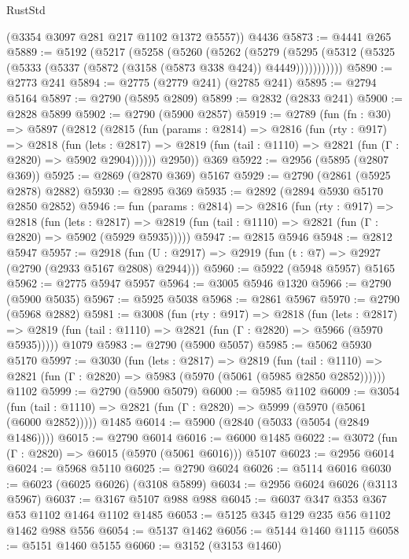 \begin{lexlean}{RustStd}
\begin{coremodule}
      (@3354 @3097 @281 @217 @1102 @1372 @5557))
    @4436
@5873 := @4441 @265
@5889 := @5192
    (@5217
      (@5258
        (@5260
          (@5262
            (@5279
              (@5295 (@5312 (@5325 (@5333 (@5337 (@5872 (@3158 (@5873 @338 @424)) @4449)))))))))))
@5890 := @2773 @241
@5894 := @2775 (@2779 @241) (@2785 @241)
@5895 := @2794 @5164
@5897 := @2790 (@5895 @2809)
@5899 := @2832 (@2833 @241)
@5900 := @2828 @5899
@5902 := @2790 (@5900 @2857)
@5919 := @2789
    (fun (fn : @30) =>
    @5897
      (@2812
        (@2815
          (fun (params : @2814) =>
          @2816
            (fun (rty : @917) =>
            @2818
              (fun (lets : @2817) =>
              @2819 (fun (tail : @1110) => @2821 (fun (Γ : @2820) => @5902 @2904))))))
        @2950))
    @369
@5922 := @2956 (@5895 (@2807 @369))
@5925 := @2869 (@2870 @369) @5167
@5929 := @2790 (@2861 (@5925 @2878) @2882)
@5930 := @2895 @369
@5935 := @2892 (@2894 @5930 @5170 @2850 @2852)
@5946 := fun (params : @2814) =>
  @2816
    (fun (rty : @917) =>
    @2818
      (fun (lets : @2817) =>
      @2819 (fun (tail : @1110) => @2821 (fun (Γ : @2820) => @5902 (@5929 @5935)))))
@5947 := @2815 @5946
@5948 := @2812 @5947
@5957 := @2918 (fun (U : @2917) => @2919 (fun (t : @7) => @2927 (@2790 (@2933 @5167 @2808) @2944)))
@5960 := @5922 (@5948 @5957) @5165
@5962 := @2775 @5947 @5957
@5964 := @3005 @5946 @1320
@5966 := @2790 (@5900 @5035)
@5967 := @5925 @5038
@5968 := @2861 @5967
@5970 := @2790 (@5968 @2882)
@5981 := @3008
    (fun (rty : @917) =>
    @2818
      (fun (lets : @2817) =>
      @2819 (fun (tail : @1110) => @2821 (fun (Γ : @2820) => @5966 (@5970 @5935)))))
    @1079
@5983 := @2790 (@5900 @5057)
@5985 := @5062 @5930 @5170
@5997 := @3030
    (fun (lets : @2817) =>
    @2819
      (fun (tail : @1110) => @2821 (fun (Γ : @2820) => @5983 (@5970 (@5061 (@5985 @2850 @2852))))))
    @1102
@5999 := @2790 (@5900 @5079)
@6000 := @5985 @1102
@6009 := @3054
    (fun (tail : @1110) => @2821 (fun (Γ : @2820) => @5999 (@5970 (@5061 (@6000 @2852)))))
    @1485
@6014 := @5900 (@2840 (@5033 (@5054 (@2849 @1486))))
@6015 := @2790 @6014
@6016 := @6000 @1485
@6022 := @3072 (fun (Γ : @2820) => @6015 (@5970 (@5061 @6016))) @5107
@6023 := @2956 @6014
@6024 := @5968 @5110
@6025 := @2790 @6024
@6026 := @5114 @6016
@6030 := @6023 (@6025 @6026) (@3108 @5899)
@6034 := @2956 @6024 @6026 (@3113 @5967)
@6037 := @3167 @5107 @988 @988
@6045 := @6037 @347 @353 @367 @53 @1102 @1464 @1102 @1485
@6053 := @5125 @345 @129 @235 @56 @1102 @1462 @988 @556
@6054 := @5137 @1462
@6056 := @5144 @1460 @1115
@6058 := @5151 @1460 @5155
@6060 := @3152 (@3153 @1460)

\end{coremodule}
\end{lexlean}
